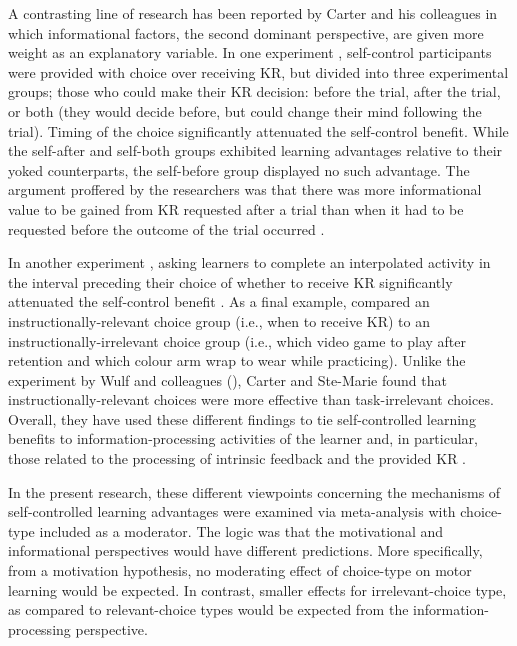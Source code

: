 \documentclass[man,floatsintext,hidelinks]{apa7}
\begin{document}
A contrasting line of research has been reported by Carter and his colleagues \parencite{Carter2014-up,Carter2017-ix,Carter2017-mk} in which informational factors, the second dominant perspective, are given more weight as an explanatory variable. In one experiment \parencite{Carter2014-up}, self-control participants were provided with choice over receiving KR, but divided into three experimental groups; those who could make their KR decision: before the trial, after the trial, or both (they would decide before, but could change their mind following the trial). Timing of the choice significantly attenuated the self-control benefit. While the self-after and self-both groups exhibited learning advantages relative to their yoked counterparts, the self-before group displayed no such advantage. The argument proffered by the researchers was that there was more informational value to be gained from KR requested after a trial than when it had to be requested before the outcome of the trial occurred \parencite[also see][]{Chiviacowsky2005-iq}. 

In another experiment \parencite{Carter2017-ix}, asking learners to complete an interpolated activity in the interval preceding their choice of whether to receive KR significantly attenuated the self-control benefit \parencite[also see][]{Couvillion2020-zw,Woodard2020-uq}. As a final example, \Textcite{Carter2017-mk} compared an instructionally-relevant choice group (i.e., when to receive KR) to an instructionally-irrelevant choice group (i.e., which video game to play after retention and which colour arm wrap to wear while practicing). Unlike the experiment by Wulf and colleagues (\citeyear{Wulf2018-ie}), Carter and Ste-Marie found that instructionally-relevant choices were more effective than task-irrelevant choices. Overall, they have used these different findings to tie self-controlled learning benefits to information-processing activities of the learner and, in particular, those related to the processing of intrinsic feedback \parencite[e.g.,][]{Chiviacowsky2005-iq,Carter2017-ix} and the provided KR \parencite[e.g.,][]{Grand2015-de}.

In the present research, these different viewpoints concerning the mechanisms of self-controlled learning advantages were examined via meta-analysis with choice-type included as a moderator. The logic was that the motivational and informational perspectives would have different predictions. More specifically, from a motivation hypothesis, no moderating effect of choice-type on motor learning would be expected. In contrast, smaller effects for irrelevant-choice type, as compared to relevant-choice types would be expected from the information-processing perspective. 
\end{document}
